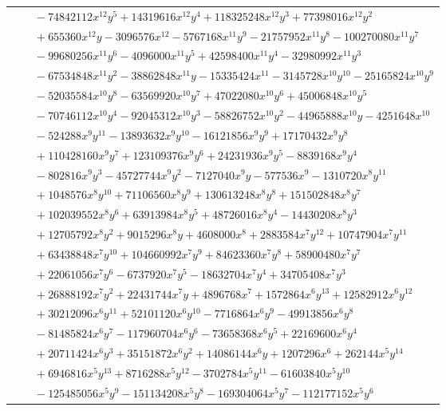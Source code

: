 \documentclass[11pt]{article}
\begin{document}
\begin{longtable}{@{}ll@{}}
 & $\quad -74842112x^{12}y^{5}+14319616x^{12}y^{4}+118325248x^{12}y^{3}+77398016x^{12}y^{2}$\\
 & $\quad +655360x^{12}y-3096576x^{12}-5767168x^{11}y^{9}-21757952x^{11}y^{8}-100270080x^{11}y^{7}$\\
 & $\quad -99680256x^{11}y^{6}-4096000x^{11}y^{5}+42598400x^{11}y^{4}-32980992x^{11}y^{3}$\\
 & $\quad -67534848x^{11}y^{2}-38862848x^{11}y-15335424x^{11}-3145728x^{10}y^{10}-25165824x^{10}y^{9}$\\
 & $\quad -52035584x^{10}y^{8}-63569920x^{10}y^{7}+47022080x^{10}y^{6}+45006848x^{10}y^{5}$\\
 & $\quad -70746112x^{10}y^{4}-92045312x^{10}y^{3}-58826752x^{10}y^{2}-44965888x^{10}y-4251648x^{10}$\\
 & $\quad -524288x^{9}y^{11}-13893632x^{9}y^{10}-16121856x^{9}y^{9}+17170432x^{9}y^{8}$\\
 & $\quad +110428160x^{9}y^{7}+123109376x^{9}y^{6}+24231936x^{9}y^{5}-8839168x^{9}y^{4}$\\
 & $\quad -802816x^{9}y^{3}-45727744x^{9}y^{2}-7127040x^{9}y-577536x^{9}-1310720x^{8}y^{11}$\\
 & $\quad +1048576x^{8}y^{10}+71106560x^{8}y^{9}+130613248x^{8}y^{8}+151502848x^{8}y^{7}$\\
 & $\quad +102039552x^{8}y^{6}+63913984x^{8}y^{5}+48726016x^{8}y^{4}-14430208x^{8}y^{3}$\\
 & $\quad +12705792x^{8}y^{2}+9015296x^{8}y+4608000x^{8}+2883584x^{7}y^{12}+10747904x^{7}y^{11}$\\
 & $\quad +63438848x^{7}y^{10}+104660992x^{7}y^{9}+84623360x^{7}y^{8}+58900480x^{7}y^{7}$\\
 & $\quad +22061056x^{7}y^{6}-6737920x^{7}y^{5}-18632704x^{7}y^{4}+34705408x^{7}y^{3}$\\
 & $\quad +26888192x^{7}y^{2}+22431744x^{7}y+4896768x^{7}+1572864x^{6}y^{13}+12582912x^{6}y^{12}$\\
 & $\quad +30212096x^{6}y^{11}+52101120x^{6}y^{10}-7716864x^{6}y^{9}-49913856x^{6}y^{8}$\\
 & $\quad -81485824x^{6}y^{7}-117960704x^{6}y^{6}-73658368x^{6}y^{5}+22169600x^{6}y^{4}$\\
 & $\quad +20711424x^{6}y^{3}+35151872x^{6}y^{2}+14086144x^{6}y+1207296x^{6}+262144x^{5}y^{14}$\\
 & $\quad +6946816x^{5}y^{13}+8716288x^{5}y^{12}-3702784x^{5}y^{11}-61603840x^{5}y^{10}$\\
 & $\quad -125485056x^{5}y^{9}-151134208x^{5}y^{8}-169304064x^{5}y^{7}-112177152x^{5}y^{6}$\\

\end{longtable}
\end{document}
